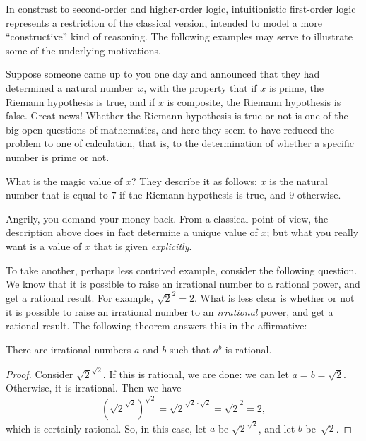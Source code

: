 \documentclass[../../include/open-logic-section]{subfiles}
\begin{document}


In constrast to second-order and higher-order logic, intuitionistic
first-order logic represents a restriction of the classical version,
intended to model a more ``constructive'' kind of reasoning. The
following examples may serve to illustrate some of the underlying
motivations.

Suppose someone came up to you one day and announced that they had
determined a natural number~$x$, with the property that if $x$ is
prime, the Riemann hypothesis is true, and if $x$ is composite, the
Riemann hypothesis is false. Great news!{} Whether the Riemann
hypothesis is true or not is one of the big open questions of
mathematics, and here they seem to have reduced the problem to one of
calculation, that is, to the determination of whether a specific
number is prime or not.

What is the magic value of $x$? They describe it as follows: $x$ is
the natural number that is equal to $7$ if the Riemann hypothesis is
true, and $9$ otherwise.

Angrily, you demand your money back. From a classical point of view,
the description above does in fact determine a unique value of $x$;
but what you really want is a value of $x$ that is given
\emph{explicitly}.

To take another, perhaps less contrived example, consider the
following question. We know that it is possible to raise an irrational
number to a rational power, and get a rational result. For example,
$\sqrt{2}^2 = 2$. What is less clear is whether or not it is possible
to raise an irrational number to an \emph{irrational} power, and get a
rational result. The following theorem answers this in the
affirmative:

\begin{thm}
There are irrational numbers $a$ and $b$ such that $a^b$ is rational.
\end{thm}

\begin{proof}
Consider $\sqrt{2}^{\sqrt{2}}$. If this is rational, we are done:
we can let $a = b = \sqrt{2}$. Otherwise, it is irrational. Then we
have
\[
(\sqrt{2}^{\sqrt{2}})^{\sqrt{2}} = \sqrt{2}^{\sqrt{2} \cdot
  \sqrt{2}} = \sqrt{2}^2 = 2,
\]
which is certainly rational. So, in this case, let $a$ be
$\sqrt{2}^{\sqrt{2}}$, and let $b$ be~$\sqrt 2$.
\end{proof}
\end{document}

